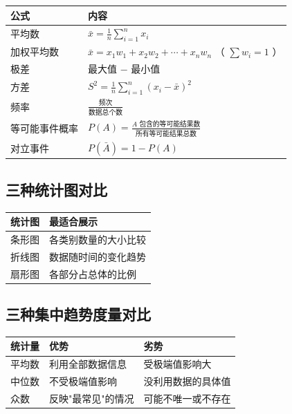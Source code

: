 \begin{center}
\begin{tabular}{ll}
\toprule
公式 & 内容 \\
\midrule
平均数 & $\bar{x} = \frac{1}{n}\sum_{i=1}^{n} x_i$ \\
加权平均数 & $\bar{x} = x_1 w_1 + x_2 w_2 + \cdots + x_n w_n$ （ $\sum w_i = 1$ ） \\
极差 & 最大值 $-$ 最小值 \\
方差 & $S^2 = \frac{1}{n}\sum_{i=1}^{n}(x_i - \bar{x})^2$ \\
频率 & $\frac{\text{频次}}{\text{数据总个数}}$ \\
等可能事件概率 & $P(A) = \frac{A \text{ 包含的等可能结果数}}{\text{所有等可能结果总数}}$ \\
对立事件 & $P(\bar{A}) = 1 - P(A)$ \\
\bottomrule
\end{tabular}
\end{center}


\subsection*{三种统计图对比}


\begin{center}
\begin{tabular}{ll}
\toprule
统计图 & 最适合展示 \\
\midrule
条形图 & 各类别数量的大小比较 \\
折线图 & 数据随时间的变化趋势 \\
扇形图 & 各部分占总体的比例 \\
\bottomrule
\end{tabular}
\end{center}


\subsection*{三种集中趋势度量对比}


\begin{center}
\begin{tabular}{lll}
\toprule
统计量 & 优势 & 劣势 \\
\midrule
平均数 & 利用全部数据信息 & 受极端值影响大 \\
中位数 & 不受极端值影响 & 没利用数据的具体值 \\
众数 & 反映"最常见"的情况 & 可能不唯一或不存在 \\
\bottomrule
\end{tabular}
\end{center}




